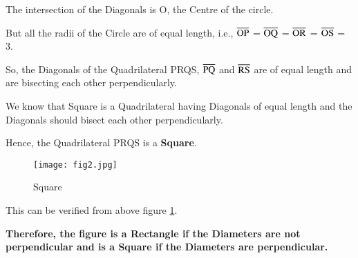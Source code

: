\documentclass[journal,12pt,twocolumn]{IEEEtran}
\begin{document}
The intersection of the Diagonals is O, the Centre of the circle.

But all the radii of the Circle are of equal length, i.e., $\overline{\rm OP}$ = $\overline{\rm OQ}$ = $\overline{\rm OR}$ = $\overline{\rm OS}$ = 3.

So, the Diagonals of the Quadrilateral PRQS, $\overline{\rm PQ}$ and $\overline{\rm RS}$ are of equal length and are bisecting each other perpendicularly.

We know that Square is a Quadrilateral having Diagonals of equal length and the Diagonals should bisect each other perpendicularly.

Hence, the Quadrilateral PRQS is a \textbf{Square}.

\begin{figure}[!h]
\centering
\texttt{[image: fig2.jpg]}
\caption{Square}
\label{square}
\end{figure}

This can be verified from above figure \ref{square}.

\textbf{Therefore, the figure is a Rectangle if the Diameters are not perpendicular and is a Square if the Diameters are perpendicular.}
\end{document}
